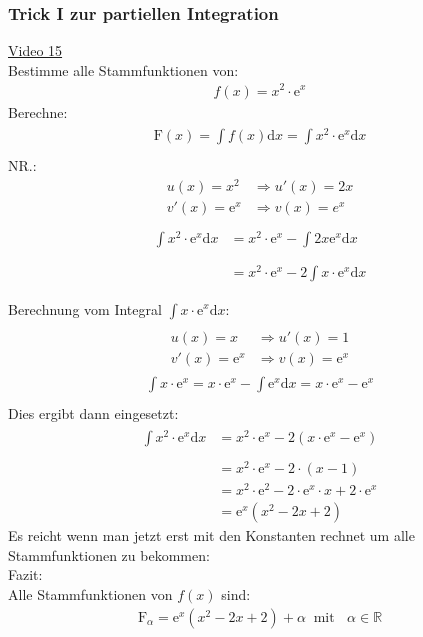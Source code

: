 \subsubsection{Trick I zur partiellen Integration }
\href{https://youtu.be/EM79gyqz1yo}{Video 15}\\
Bestimme alle Stammfunktionen von:\\
\begin{align*}
f(x)=x^2\cdot \mathrm{e} ^x
\end{align*}
Berechne:\\
\begin{align*}
\mathrm{F}(x)=\int\limits_{}^{} f(x)\mathrm{d}x=\int\limits_{}^{} x^2\cdot \mathrm{e}^x\mathrm{d}x
\end{align*}
NR.:\\
\begin{align*}
u(x)=x^2&\Rightarrow u'(x)=2x\\
v'(x)=\mathrm{e}^x&\Rightarrow v(x)=e^x\\
\end{align*}
\begin{align*}
\int\limits_{}^{}x^2\cdot \mathrm{e}^x\mathrm{d}x&= x^2\cdot \mathrm{e}^x-\int\limits_{}^{} 2x\mathrm{e}^x\mathrm{d}x\\
&=x^2\cdot \mathrm{e}^x-2\int\limits_{}^{} x\cdot \mathrm{e}^x\mathrm{d}x\\
\end{align*}
Berechnung vom Integral $\int\limits_{}^{}x\cdot \mathrm{e}^x\mathrm{d}x  $:\\
\begin{align*}
u(x)=x&\Rightarrow u'(x)=1\\
v'(x)=\mathrm{e}^x&\Rightarrow v(x)=\mathrm{e}^x
\end{align*}
\begin{align*}
\int\limits_{}^{} x\cdot \mathrm{e}^x=x \cdot \mathrm{e}^x-\int\limits_{}^{}\mathrm{e}^x\mathrm{d}x=x\cdot \mathrm{e}^x-\mathrm{e}^x 
\end{align*}
Dies ergibt dann eingesetzt:\\
\begin{align*}
\int\limits_{}^{} x^2\cdot \mathrm{e}^x\mathrm{d}x&=x^2\cdot \mathrm{e}^x-2(x\cdot \mathrm{e}^x-\mathrm{e}^x)\\
&=x^2\cdot \mathrm{e}^x-2\cdot(x-1)\\
&=x^2\cdot \mathrm{e}^2-2\cdot\mathrm{e}^x\cdot x+2\cdot \mathrm{e}^x\\
&=\mathrm{e}^x(x^2-2x+2)
\end{align*}
Es reicht wenn man jetzt erst mit den Konstanten rechnet um alle Stammfunktionen zu bekommen:\\
Fazit:\\
Alle Stammfunktionen von $ f(x) $ sind:\\
\begin{align*}
\mathrm{F}_\alpha=\mathrm{e}^x(x^2-2x+2) +\alpha\;\;\text{mit }\;\;\alpha\in\mathbb{R}
\end{align*}





